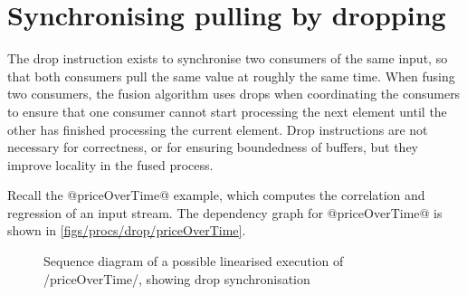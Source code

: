 \section{Synchronising pulling by dropping}
\label{s:Drop:in:synchrony}

The drop instruction exists to synchronise two consumers of the same input, so that both consumers pull the same value at roughly the same time.
When fusing two consumers, the fusion algorithm uses drops when coordinating the consumers to ensure that one consumer cannot start processing the next element until the other has finished processing the current element.
Drop instructions are not necessary for correctness, or for ensuring boundedness of buffers, but they improve locality in the fused process.



Recall the @priceOverTime@ example, which computes the correlation and regression of an input stream.
The dependency graph for @priceOverTime@ is shown in \cref{figs/procs/drop/priceOverTime}.

\begin{figure}
\center
\begin{sequencediagram}









\end{sequencediagram}
\caption[Sequence diagram of execution with drop synchronisation]{Sequence diagram of a possible linearised execution of \Hs/priceOverTime/, showing drop synchronisation}
\label{figs/swim/drop/priceOverTime}
\end{figure}

